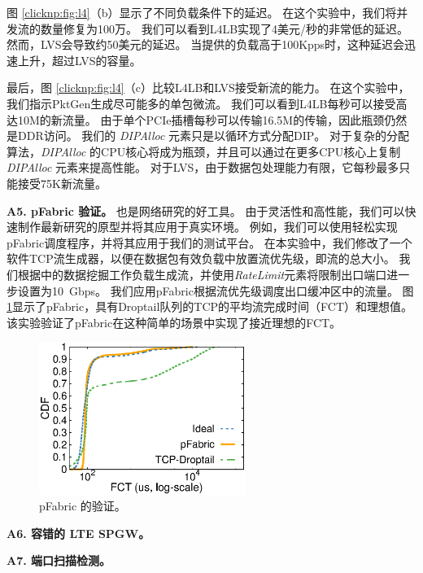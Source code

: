 图 \ref {clicknp:fig:l4}（b）显示了不同负载条件下的延迟。
在这个实验中，我们将并发流的数量修复为100万。
我们可以看到L4LB实现了4美元/秒的非常低的延迟。
然而，LVS会导致约50美元的延迟。
当提供的负载高于100Kpps时，这种延迟会迅速上升，超过LVS的容量。

最后，图 \ref {clicknp:fig:l4}（c）比较L4LB和LVS接受新流的能力。
在这个实验中，我们指示PktGen生成尽可能多的单包微流。
我们可以看到L4LB每秒可以接受高达10M的新流量。
由于单个PCIe插槽每秒可以传输16.5M的传输，因此瓶颈仍然是DDR访问。
我们的 \textit {DIPAlloc} 元素只是以循环方式分配DIP。
对于复杂的分配算法，\textit {DIPAlloc} 的CPU核心将成为瓶颈，并且可以通过在更多CPU核心上复制 \textit {DIPAlloc} 元素来提高性能。
对于LVS，由于数据包处理能力有限，它每秒最多只能接受75K新流量。


\textbf {A5. pFabric 验证。}
\name 也是网络研究的好工具。
由于灵活性和高性能，我们可以快速制作最新研究的原型并将其应用于真实环境。
例如，我们可以使用\name 轻松实现pFabric调度程序\cite {pfabric}，并将其应用于我们的测试平台。
在本实验中，我们修改了一个软件TCP流生成器\cite {mqecn}，以便在数据包有效负载中放置流优先级，即流的总大小。
我们根据\cite {pfabric}中的数据挖掘工作负载生成流，并使用\textit {RateLimit}元素将限制出口端口进一步设置为10~Gbps。
我们应用pFabric根据流优先级调度出口缓冲区中的流量。
图 \ref {clicknp:fig:pfabric}显示了pFabric，具有Droptail队列的TCP的平均流完成时间（FCT）和理想值。
该实验验证了pFabric在这种简单的场景中实现了接近理想的FCT。

\begin{figure}[h!]
	\centering
	\includegraphics[width=0.6\textwidth]{eval/pfabric}
	
	\caption{pFabric 的验证。}
	\label{clicknp:fig:pfabric}
	
\end{figure}



\iffalse
\textbf{A6. 容错的 LTE SPGW。}

\textbf{A7. 端口扫描检测。}

